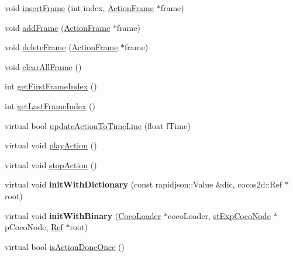 \begin{DoxyCompactItemize}
\item 
void \hyperlink{classcocostudio_1_1ActionNode_a878d16c3aee4203fddf6891f90f9bc8d}{insert\+Frame} (int index, \hyperlink{classcocostudio_1_1ActionFrame}{Action\+Frame} $\ast$frame)
\item 
void \hyperlink{classcocostudio_1_1ActionNode_a982d01cb4931e108f5d02bf3cc6ec9c3}{add\+Frame} (\hyperlink{classcocostudio_1_1ActionFrame}{Action\+Frame} $\ast$frame)
\item 
void \hyperlink{classcocostudio_1_1ActionNode_a5b671d485ec7f81f5012ca6d7fa73aa5}{delete\+Frame} (\hyperlink{classcocostudio_1_1ActionFrame}{Action\+Frame} $\ast$frame)
\item 
void \hyperlink{classcocostudio_1_1ActionNode_aecb985671dc22f4e3beecadbd63badd9}{clear\+All\+Frame} ()
\item 
int \hyperlink{classcocostudio_1_1ActionNode_acd66f401500fc2dc3bbe561f5b58f177}{get\+First\+Frame\+Index} ()
\item 
int \hyperlink{classcocostudio_1_1ActionNode_a4f5f69fc0b097ab421ce518b10f316c1}{get\+Last\+Frame\+Index} ()
\item 
virtual bool \hyperlink{classcocostudio_1_1ActionNode_a461ce812ca4351642b00b0f3a2364684}{update\+Action\+To\+Time\+Line} (float f\+Time)
\item 
virtual void \hyperlink{classcocostudio_1_1ActionNode_a141a91f5ab11abe00f3adb4b90771e20}{play\+Action} ()
\item 
virtual void \hyperlink{classcocostudio_1_1ActionNode_a0fa3d85576b77bc3ae587fe5eab20b7e}{stop\+Action} ()
\item 
\mbox{\label{classcocostudio_1_1ActionNode_ab7ec9c17da0925414cb3df83340e1f26}} 
virtual void {\bfseries init\+With\+Dictionary} (const rapidjson\+::\+Value \&dic, cocos2d\+::\+Ref $\ast$root)
\item 
\mbox{\label{classcocostudio_1_1ActionNode_aa7c3d7ba5842b6cf3edc85d668ecd8f3}} 
virtual void {\bfseries init\+With\+Binary} (\hyperlink{classcocostudio_1_1CocoLoader}{Coco\+Loader} $\ast$coco\+Loader, \hyperlink{structcocostudio_1_1stExpCocoNode}{st\+Exp\+Coco\+Node} $\ast$p\+Coco\+Node, \hyperlink{classRef}{Ref} $\ast$root)
\item 
virtual bool \hyperlink{classcocostudio_1_1ActionNode_acbb8ef4826226220698b4d0a13d9f835}{is\+Action\+Done\+Once} ()
\end{DoxyCompactItemize}
